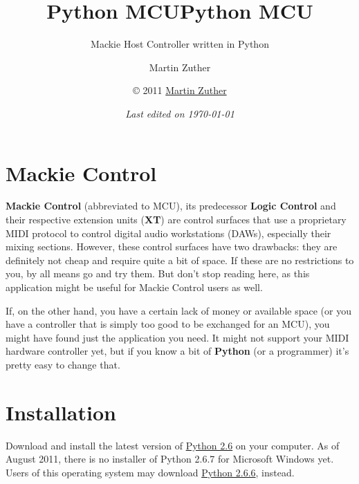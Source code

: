 


\title{Python MCU}
\author{Martin Zuther}



\title{Python MCU}

\subtitle{
  \normalsize{\textrm{\textmd{
        \vfill
        Mackie Host Controller written in Python
        \vfill
        \vspace{10em}
        \vfill
      }}}
}

\author{\normalsize\copyright{} 2011
  \href{http://www.mzuther.de/}{Martin Zuther}}

\date{\normalsize \emph{Last edited on \today}}

\maketitle

\tableofcontents

\clearpage  %

\chapter{Mackie Control}
\label{chap:mackie_control}

\textbf{Mackie Control} (abbreviated to MCU), its predecessor
\textbf{Logic Control} and their respective extension units
(\textbf{XT}) are control surfaces that use a proprietary MIDI
protocol to control digital audio workstations (DAWs), especially
their mixing sections.  However, these control surfaces have two
drawbacks: they are definitely not cheap and require quite a bit of
space.  If these are no restrictions to you, by all means go and try
them.  But don't stop reading here, as this application might be
useful for Mackie Control users as well.

If, on the other hand, you have a certain lack of money or available
space (or you have a controller that is simply too good to be
exchanged for an MCU), you might have found just the application you
need.  It might not support your MIDI hardware controller yet, but if
you know a bit of \textbf{Python} (or a programmer) it's pretty easy
to change that.


\chapter{Installation}
\label{chap:python_mcu}

Download and install the latest version of
\href{http://www.python.org/}{Python 2.6} on your computer.  As of
August 2011, there is no installer of Python 2.6.7 for Microsoft
Windows yet.  Users of this operating system may download
\href{http://www.python.org/download/releases/2.6.6/}{Python 2.6.6},
instead.

